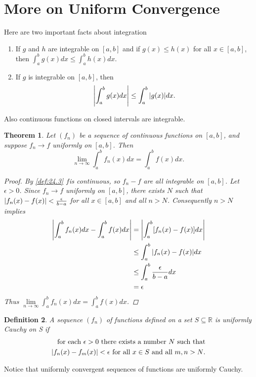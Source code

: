 \documentclass[12pt, lettersize]{book}
\newtheorem{thm}{Theorem}[section]
\newtheorem{dfn}[thm]{Definition}
\newcommand{\R}{\mathbb{R}}
\begin{document}
		\section{More on Uniform Convergence}
			Here are two important facts about integration
			\begin{enumerate}
				\item If $g$ and $h$ are integrable on $[a,b]$ and if $g(x)\leq h(x)$ for all $x\in[a,b]$, then $\int_{a}^{b}g(x)dx\leq\int_{a}^{b}h(x)dx$.
				\item If $g$ is integrable on $[a,b]$, then
				\begin{displaymath}
					\abs{\int_{a}^{b}g(x)dx}\leq\int_{a}^{b}\abs{g(x)}dx.
				\end{displaymath}
			\end{enumerate}
			Also continuous functions on closed intervals are integrable.
			
			\begin{thm}\label{thm:25.2}
			Let $(f_n)$ be a sequence of continuous functions on $[a,b]$, and suppose $f_n\rightarrow f$ uniformly on $[a,b]$. Then
			\begin{displaymath}
				\lim\limits_{n\rightarrow\infty}\int_{a}^{b}f_n(x)dx=\int_{a}^{b}f(x)dx.
			\end{displaymath}
			\begin{proof}
			By \ref{def:24.3} $f$is continuous, so $f_n-f$ are all integrable on $[a,b]$. Let $\epsilon>0$. Since $f_n\rightarrow f$ uniformly on $[a,b]$, there exists $N$ such that $\abs{f_n(x)-f(x)}<\frac{\epsilon}{b-a}$ for all $x\in[a,b]$ and all $n>N$. Consequently $n>N$ implies
			\begin{align*}
				\abs{\int_{a}^{b}f_n(x)dx-\int_{a}^{b}f(x)dx}&=\abs{\int_{a}^{b}[f_n(x)-f(x)]dx}\\
															 &\leq\int_{a}^{b}\abs{f_n(x)-f(x)}dx\\
															 &\leq\int_{a}^{b}\frac{\epsilon}{b-a}dx\\
															 &=\epsilon
			\end{align*}
			Thus $\lim\limits_{n\rightarrow\infty}\int_{a}^{b}f_n(x)dx=\int_{a}^{b}f(x)dx$.
			\end{proof}
			\end{thm}
			
			\begin{dfn}
			A sequence $(f_n)$ of functions defined on a set $S\subseteq\R$ is \emph{uniformly Cauchy on S} if
			\begin{align*}
				\text{for each $\epsilon>0$ there exists a number $N$ such that}\\
				\text{$\abs{f_n(x)-f_m(x)}<\epsilon$ for all $x\in S$ and all $m,n>N$.}
			\end{align*}
			\end{dfn}
			Notice that uniformly convergent sequences of functions are uniformly Cauchy.
			
\end{document}
